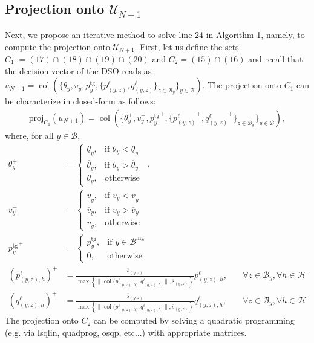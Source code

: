 \documentclass[10pt]{article}
\newtheorem{definitiox	n}{Definition}{\it}{}
\newcommand{\mc}{\mathcal}
\newcommand{\proj}{\mathrm{proj}}
\newcommand{\col}{\operatorname{col}}
\newcommand{\0}{\mathbf{0}}
\newcommand{\1}{\mathbf{1}}
\begin{document}

\subsection{Projection onto $\mc U_{N+1}$}
Next, we propose an iterative method to solve line 24 in Algorithm 1, namely, to compute the projection onto $\mathcal{U}_{N+1}$. First, let us define the sets $C_1 := (17)\cap(18)\cap(19)\cap(20) $ and $C_2 = (15)\cap(16)$ and recall that the decision vector of the DSO reads as $u_{N+1}=\col\left(\{\theta_y, v_y, p_y^{\mathrm{tg}},\{p_{(y,z)}^{\ell},q_{(y,z)}^{\ell}\}_{z \in \mc B_y} \}_{y\in\mc B} \right)$. The projection onto $C_1$ can be characterize in closed-form as follows:
\begin{align*}
\proj_{C_1}(u_{N+1})=
\col\left(\{\theta_y^+, v_y^+, {p_y^{\mathrm{tg}}}^+,\{ {p_{(y,z)}^{\ell}}^+, {q_{(y,z)}^{\ell}}^+ \}_{z \in \mc B_y} \}_{y\in\mc B} \right),
\end{align*}
where, for all $y \in \mc B$,
\begin{align*}
\theta_y^+ &=
\begin{cases}
\underline{\theta}_y, & \text{if } \theta_y < \underline{\theta}_y\\
\overline{\theta}_y, & \text{if } \theta_y > \overline{\theta}_y\\
\theta_y, & \text{otherwise } \
\end{cases}, &  \\
%
v_y^+ &= 
\begin{cases}
\underline{v}_y, & \text{if } v_y < \underline{v}_y\\
\overline{v}_y, & \text{if } v_y > \overline{v}_y\\
v_y, & \text{otherwise } \
\end{cases}
 & \\
%
{p_y^{\text{tg}}}^+ &= 
\begin{cases}
p_y^{\text{tg}}, & \text{if } y \in \mc B^{\text{mg}}\\
0, & \text{otherwise} 
\end{cases}
\\
%
{(p^\ell_{(y,z),h})}^+ & = \frac{\overline{s}_{(y,z)}}{
\max \left\{ \|\col(p^\ell_{(y,z),h)} , q^\ell_{(y,z),h)} \|, \overline{s}_{(y,z)} \right\}
} p^\ell_{(y,z),h},& \quad \forall z \in \mc B_y, \forall h \in \mc H \\
{(q^\ell_{(y,z),h})}^+ & = \frac{\overline{s}_{(y,z)}}{
\max \left\{ \|\col(p^\ell_{(y,z),h)} , q^\ell_{(y,z),h)} \|, \overline{s}_{(y,z)} \right\}
} q^\ell_{(y,z),h} , & \quad \forall z \in \mc B_y, \forall h \in \mc H
\end{align*}
The projection onto $C_2$ can be computed by solving a quadratic programming (e.g. via lsqlin, quadprog, osqp, etc...) with appropriate matrices.
\end{document}
